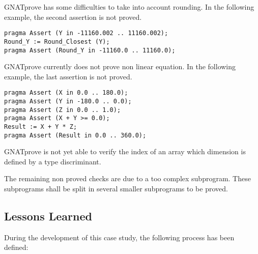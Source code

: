 \documentclass[10pt,a4paper,twocolumn]{article}
\newcommand{\gnatprove}{GNATprove\xspace}
\begin{document}
\gnatprove has some difficulties to take into account rounding.
In the following example, the second assertion is not proved.
\begin{lstlisting}
pragma Assert (Y in -11160.002 .. 11160.002);
Round_Y := Round_Closest (Y);
pragma Assert (Round_Y in -11160.0 .. 11160.0);
\end{lstlisting}
\gnatprove currently does not prove non linear equation.
In the following example, the last assertion is not proved.
\begin{lstlisting}
pragma Assert (X in 0.0 .. 180.0);
pragma Assert (Y in -180.0 .. 0.0);
pragma Assert (Z in 0.0 .. 1.0);
pragma Assert (X + Y >= 0.0);
Result := X + Y * Z;
pragma Assert (Result in 0.0 .. 360.0);
\end{lstlisting}
\gnatprove is not yet able to verify the index of an array which dimension is defined by a type discriminant.

The remaining non proved checks are due to a too complex subprogram.
These subprograms shall be split in several smaller subprograms to be proved.

\subsection{Lessons Learned}

During the development of this case study, the following process has been defined:
\end{document}
